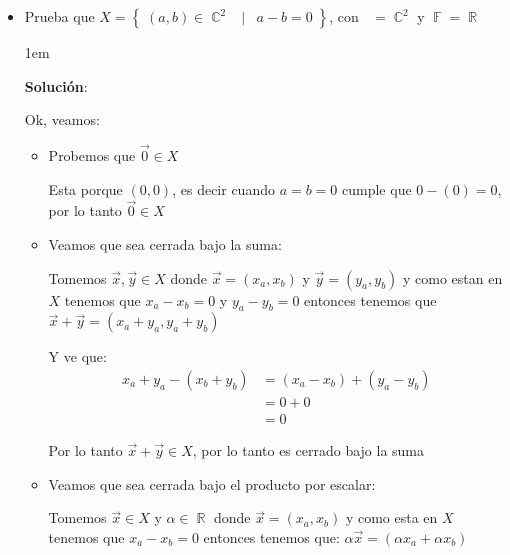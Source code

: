 \documentclass[12pt, fleqn]{report}                             %
\newenvironment{SmallIndentation}[1][0.75em]                    %
        {\begin{adjustwidth}{#1}{}\begin{footnotesize}}             %
        {\end{footnotesize}\end{adjustwidth}}                       %
\DeclareMathOperator \Space {\quad}                             %
\DeclareMathOperator \MiniSpace {\;}                            %
\newcommand \Such {\MiniSpace | \MiniSpace}                     %
\theoremstyle{break}                                            %
\DeclareMathOperator \Reals        {\mathbb{R}}                 %
\DeclareMathOperator \Complexs     {\mathbb{C}}                 %
\DeclareMathOperator \GenericField {\mathbb{F}}                 %
\DeclareMathOperator \VectorSet    {\mathbb{V}}                 %
\DeclareMathOperator \VectorSpace  {\VectorSet_{\GenericField}} %
\newcommand{\Set}[1]    {\left\{ \; #1 \; \right\}}             %
\begin{document}
\begin{itemize}
                \clearpage

                \item 
                    Prueba que $X = \Set{(a, b) \in \Complexs^2 \Such a - b = 0}$, con 
                    $\VectorSpace = \Complexs^2$ y $\GenericField = \Reals$


                    \begin{SmallIndentation}[1em]
                        \textbf{Solución}:

                        Ok, veamos:
                        \begin{itemize}
                            
                            \item Probemos que $\vec 0 \in X$

                                Esta porque $(0, 0)$, es decir cuando $a = b = 0$ cumple que $0 - (0) = 0$, por
                                lo tanto $\vec 0 \in X$

                            \item
                                Veamos que sea cerrada bajo la suma:

                                Tomemos $\vec x, \vec y \in X$ donde $\vec x = (x_a, x_b)$ y $\vec y = (y_a, y_b)$
                                y como estan en $X$ tenemos que $x_a - x_b = 0$ y $y_a - y_b = 0$ entonces
                                tenemos que $\vec x + \vec y = (x_a + y_a, y_a + y_b)$

                                Y ve que:
                                \begin{align*}
                                    x_a + y_a - (x_b + y_b)
                                        &= (x_a - x_b) + (y_a - y_b)        \\
                                        &= 0 + 0                            \\
                                        &= 0
                                \end{align*}

                                Por lo tanto $\vec x + \vec y \in X$, por lo tanto es cerrado bajo la suma

                            \item
                                Veamos que sea cerrada bajo el producto por escalar:

                                Tomemos $\vec x \in X$ y $\alpha \in \Reals$ donde $\vec x = (x_a, x_b)$ y como
                                esta en $X$ tenemos que $x_a - x_b = 0$ entonces tenemos que:
                                $\alpha \vec x = (\alpha x_a + \alpha x_b)$


\end{itemize}
\end{SmallIndentation}
\end{itemize}
\end{document}
